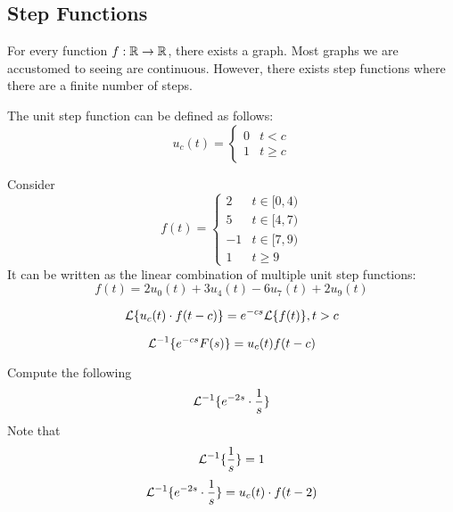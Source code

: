 \documentclass[diffeq.tex]{subfiles}
\begin{document}
    \subsection{Step Functions} %
    For every function $f: \mathbb{R} \to \mathbb{R}$, there exists a graph. Most graphs we are accustomed to seeing are continuous. However, there exists step functions where there are a finite number of steps.
    \np
    \begin{definition}
        The unit step function can be defined as follows:
        \begin{equation}
            u_{c}(t) = \begin{cases}
                0 & t < c\\
                1 & t \geq c
            \end{cases}
        \end{equation}
    \end{definition}
    \begin{example}
        Consider
        \begin{equation}
            f(t) = \begin{cases}
                2 & t \in [0, 4) \\
                5 & t \in [4, 7) \\
                -1 & t \in [7, 9) \\
                1 & t \geq 9
            \end{cases}
        \end{equation}
        It can be written as the linear combination of multiple unit step functions:
        \begin{equation}
            f(t) = 2u_{0}(t) + 3u_{4}(t) - 6u_{7}(t) + 2u_{9}(t)
        \end{equation}
    \end{example}
    \begin{btheorem}
        \begin{equation}
            \mathcal{L}\{u_{c}(t)\cdot f(t-c)\} = e^{-cs}\mathcal{L}\{f(t)\}, t > c
        \end{equation}
    \end{btheorem}
    \begin{corollary}
        \begin{equation}
            \mathcal{L}^{-1}\{e^{-cs}F(s)\} = u_{c}(t)f(t-c)
        \end{equation}
    \end{corollary}
    \begin{example}
        Compute the following
        \begin{equation}
            \mathcal{L}^{-1}\{e^{-2s}\cdot \frac{1}{s}\}
        \end{equation}
        Note that
        \begin{equation}
            \mathcal{L}^{-1}\{\frac{1}{s}\} = 1
        \end{equation}
        \begin{equation}
            \mathcal{L}^{-1}\{e^{-2s}\cdot \frac{1}{s}\} = u_{c}(t)\cdot f(t-2)
        \end{equation}
    \end{example}
\end{document}
